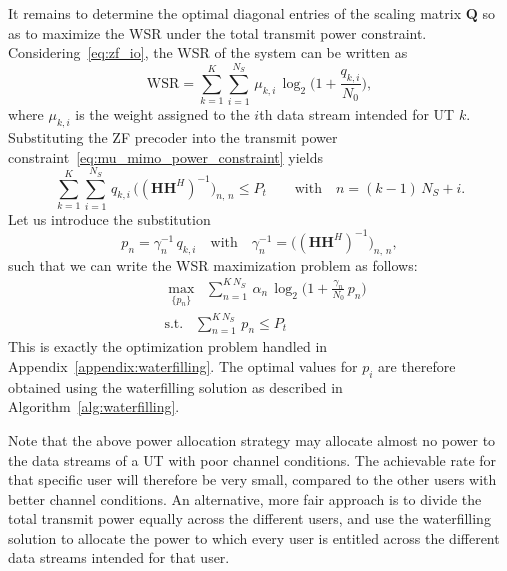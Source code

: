 It remains to determine the optimal diagonal entries of the scaling matrix $\mathbf{Q}$ so as to maximize the \acf{WSR} under the total transmit power constraint.
Considering~\eqref{eq:zf_io}, the \ac{WSR} of the system can be written as
\begin{equation}
\label{eq:zf_wsr}
    \mathrm{WSR} = \sum_{k=1}^{K} \sum_{i=1}^{N_S} \, \mu_{k, i} \, \log_2\big(1 + \frac{q_{k, i}}{N_0}\big),
\end{equation}
where $\mu_{k, i}$ is the weight assigned to the $i$th data stream intended for \ac{UT} $k$.
Substituting the \ac{ZF} precoder into the transmit power constraint~\eqref{eq:mu_mimo_power_constraint} yields %
\begin{equation}
\label{eq:zf_power_constraint}
    \sum_{k=1}^{K} \sum_{i=1}^{N_S} \, q_{k, i} \, \big((\mathbf{H} \mathbf{H}^H)^{-1}\big)_{n,\,n} \leq P_t \qquad \text{with} \quad n = (k-1)\,N_S + i.
\end{equation}
Let us introduce the substitution
\begin{equation}
    p_n = \gamma_n^{-1} \, q_{k, i} \quad \text{with} \quad \gamma^{-1}_n = \big((\mathbf{H} \mathbf{H}^H)^{-1}\big)_{n,\,n},
\end{equation}
such that we can write the \ac{WSR} maximization problem as follows:
\begin{equation}
\begin{aligned}
    &\underset{\{p_n\}}{\max} \;\; \sum_{n=1}^{K\, N_S} \, \alpha_n \, \log_2\big(1 + \frac{\gamma_n}{N_0} \, p_n \big) \\
    &\mathrm{s. t.} \;\;\; \sum_{n=1}^{K\, N_S} \, p_n \leq P_t
\end{aligned}
\end{equation}
This is exactly the optimization problem handled in Appendix~\ref{appendix:waterfilling}.
The optimal values for $p_i$ are therefore obtained using the waterfilling solution as described in Algorithm~\ref{alg:waterfilling}.

Note that the above power allocation strategy may allocate almost no power to the data streams of a \ac{UT} with poor channel conditions.
The achievable rate for that specific user will therefore be very small, compared to the other users with better channel conditions.
An alternative, more fair approach is to divide the total transmit power equally across the different users, and use the waterfilling solution to allocate the power to which every user is entitled across the different data streams intended for that user.


